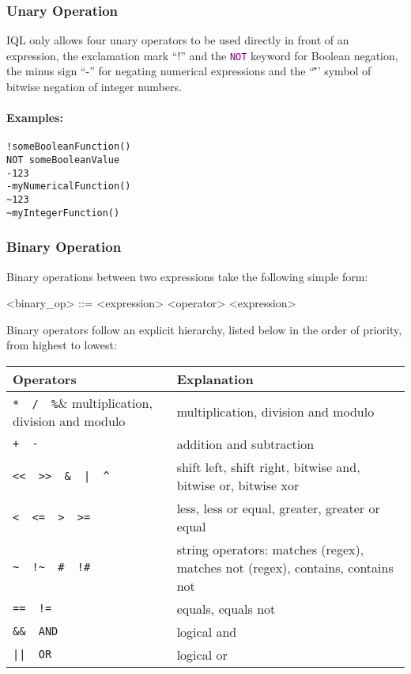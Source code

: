 \documentclass[11pt]{article}
\newcommand{\iql}{IQL\xspace}
\newcommand{\keyword}[1]{\textcolor{purple}{\texttt{#1}}}
\begin{document}
\subsubsection{Unary Operation}
\label{sec:unary-operation}

\iql only allows four unary operators to be used directly in front of an expression, the exclamation mark ``!'' and the \keyword{NOT} keyword for Boolean negation, the minus sign ``-'' for negating numerical expressions and the ``\~'' symbol of bitwise negation of integer numbers.

\paragraph{Examples:}

\begin{verbatim}
!someBooleanFunction()
NOT someBooleanValue
-123
-myNumericalFunction()
~123
~myIntegerFunction()
\end{verbatim}

\subsubsection{Binary Operation}
\label{sec:binary-operation}

Binary operations between two expressions take the following simple form:

\begin{grammar}	
	<binary_op> ::= <expression> <operator> <expression>
\end{grammar}

\noindent Binary operators follow an explicit hierarchy, listed below in the order of priority, from highest to lowest:

\noindent\begin{tabular}{|p{}|p{}|}
\hline 
Operators	& Explanation \\ 
\hline 
\hline
\verb|*  /  %|& multiplication, division and modulo \\ 
\hline 
\verb|+  -|& addition and subtraction \\ 
\hline 
\verb#<<  >>  &  |  ^#& shift left, shift right, bitwise and, bitwise or, bitwise xor \\ 
\hline 
\verb|<  <=  >  >=|& less, less or equal, greater, greater or equal \\ 
\hline 
\verb|~  !~  #  !#|& string operators: matches (regex), matches not (regex), contains, contains not \\ 
\hline 
\verb|==  !=|& equals, equals not \\ 
\hline 
\verb|&&  AND|& logical and \\ 
\hline 
\verb#||  OR#& logical or \\ 
\hline 
\end{tabular} 
\end{document}
